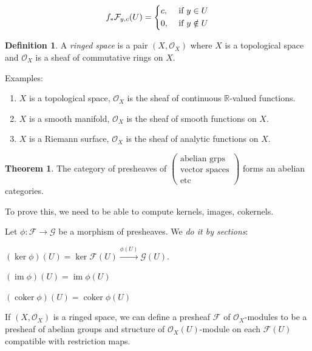 \documentclass{article}
\theoremstyle{definition}
\newtheorem*{definition}{Definition}
\newtheorem{theorem}{Theorem}
\begin{document}
    \[
        f_{\ast} \mathcal{F}_{y,c}(U) = \begin{dcases}
            c, &\text{ if } y\in U \\
            0, &\text{ if } y\notin U
        \end{dcases}
    \]

    \begin{definition}
        A \textit{ringed space} is a pair \((X, \mathcal{O}_X)\) where \(X\) is a topological space and \(\mathcal{O}_X\) is a sheaf of commutative rings on \(X\).
    \end{definition}

    Examples: 

    \begin{enumerate}[label=\arabic*)]
        \item \(X\) is a topological space, \(\mathcal{O}_X\) is the sheaf of continuous \(\mathbb{R}\)-valued functions.
        \item \(X\) is a smooth manifold, \(\mathcal{O}_X\) is the sheaf of smooth functions on \(X\).
        \item \(X\) is a Riemann surface, \(\mathcal{O}_X\) is the sheaf of analytic functions on \(X\).
    \end{enumerate}
    
    \begin{theorem}
        The category of presheaves of \(\begin{pmatrix}
            \text{abelian grps} \\
            \text{vector spaces} \\
            \text{etc}
        \end{pmatrix} \) forms an abelian categories.
    \end{theorem}

    To prove this, we need to be able to compute kernels, images, cokernels.

    Let \(\phi : \mathcal{F} \to \mathcal{G}\) be a morphism of presheaves. We \textit{do it by sections}:

    \((\ker \phi)(U) = \ker \mathcal{F}(U) \xrightarrow{\phi(U)} \mathcal{G}(U)\).

    \((\operatorname{im} \phi )(U) = \operatorname{im} \phi(U)\) 

    \((\operatorname{coker} \phi) (U) = \operatorname{coker} \phi(U)\)

    If \((X, \mathcal{O}_X)\) is a ringed space, we can define a presheaf \(\mathcal{F}\) of \(\mathcal{O}_X\)-modules to be a presheaf of abelian groups and structure of \(\mathcal{O}_X(U)\)-module on each \(\mathcal{F}(U)\) compatible with restriction maps.
\end{document}

